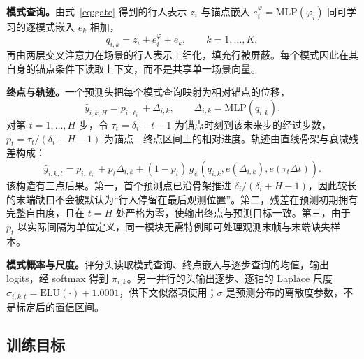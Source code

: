 \textbf{模式查询。}由式~\eqref{eq:gate} 得到的行人表示 $z_{i}$ 与锚点嵌入 $e^{\varphi}_{i}=\mathrm{MLP}(\varphi_{i})$ 同可学习的逐模式嵌入 $e_{k}$ 相加，
\begin{equation}
q_{i,k}=z_{i}+e^{\varphi}_{i}+e_{k},\qquad k=1,\dots,K,
\label{eq:query}
\end{equation}
再由两层交叉注意力在场景的行人表示上细化，填充行被屏蔽。每个模式因此在其自身的锚点条件下读取上下文，而不是共享单一场景向量。

\textbf{终点与轨迹。}一个预测头把每个模式查询映射为相对锚点的位移，
\begin{equation}
\hat{y}_{i,k,H}=p_{i,\ell_i}+\Delta_{i,k},\qquad \Delta_{i,k}=\mathrm{MLP}(q_{i,k}).
\label{eq:endpoint}
\end{equation}
对第 $t=1,\dots,H$ 步，令 $\tau_{t}=\delta_{i}+t-1$ 为锚点时刻到该未来步的经过步数，$p_{t}=\tau_{t}/(\delta_{i}+H-1)$ 为锚点—终点区间上的相对进度。轨迹由直线骨架与衰减残差构成：
\begin{equation}
\hat{y}_{i,k,t}=p_{i,\ell_i}+p_{t}\Delta_{i,k}+(1-p_{t})\,g_{\psi}(q_{i,k},e(\Delta_{i,k}),e(\tau_{t}\Delta t)).
\label{eq:traj}
\end{equation}
该构造有三点后果。第一，首个预测点已沿骨架推进 $\delta_{i}/(\delta_{i}+H-1)$，因此较长的末端缺口不会被默认为“行人停留在最后观测位置”。第二，残差在预测初期拥有完整自由度，且在 $t=H$ 处严格为零，使输出终点与预测目标一致。第三，由于 $p_{t}$ 以实际间隔为单位定义，同一模块无需特例即可处理观测末帧与末端缺失样本。

\textbf{模式概率与尺度。}评分头读取模式查询、终点嵌入与逐步查询的均值，输出 logits，经 softmax 得到 $\pi_{i,k}$。另一并行的头输出逐步、逐轴的 Laplace 尺度 $\sigma_{i,k,t}=\mathrm{ELU}(\cdot)+1.0001$，供下文似然项使用；$\sigma$ 是预测分布的离散度参数，不是标定后的置信区间。

\subsection{训练目标}
\label{sec:loss}

